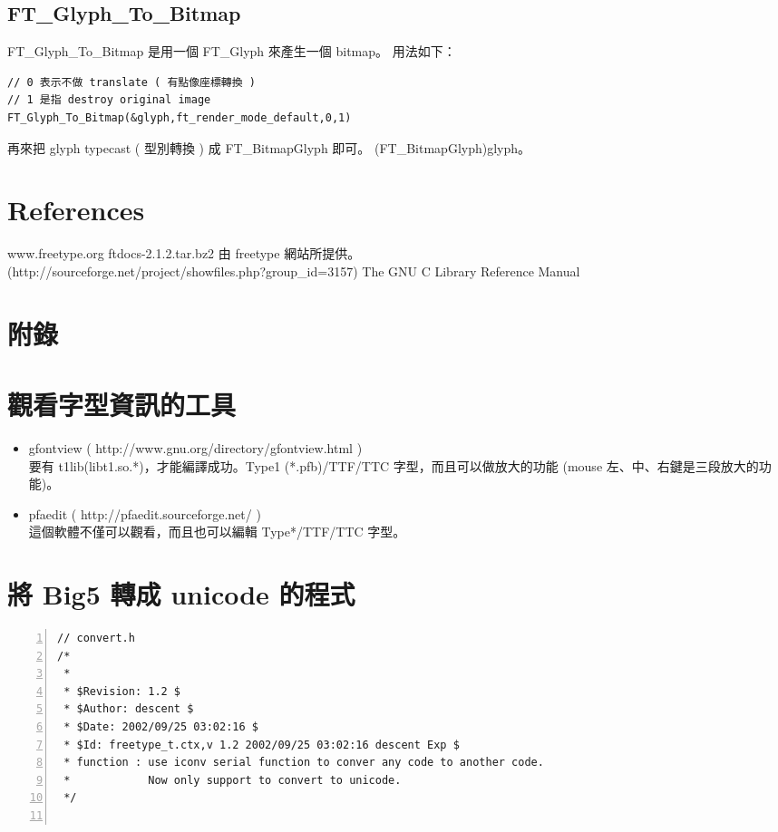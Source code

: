 \documentclass[12pt,a4]{article}
\begin{document}
\begin{CJK}{UTF8}{bsmi}
\subsection{FT\_{}Glyph\_{}To\_{}Bitmap}
FT\_{}Glyph\_{}To\_{}Bitmap 是用一個 FT\_{}Glyph 來產生一個 bitmap。 用法如下：
\begin{Verbatim}[commandchars=+!?]
// 0 表示不做 translate ( 有點像座標轉換 )
// 1 是指 destroy original image
FT_Glyph_To_Bitmap(&glyph,ft_render_mode_default,0,1)
\end{Verbatim}
再來把 glyph typecast ( 型別轉換 ) 成 FT\_{}BitmapGlyph 即可。
(FT\_{}BitmapGlyph)glyph。



\newpage
\section{References}
\begin{thebibliography}{99}
www.freetype.org
ftdocs-2.1.2.tar.bz2 由 freetype 網站所提供。\\
(http://sourceforge.net/project/showfiles.php?group\_{}id=3157)
The GNU C Library Reference Manual
\end{thebibliography}

\newpage
\section{附錄}
\appendix
\section{觀看字型資訊的工具}
\begin{itemize}
\item
gfontview ( http://www.gnu.org/directory/gfontview.html )\\
要有 t1lib(libt1.so.*)，才能編譯成功。Type1 (*.pfb)/TTF/TTC 字型，而且可以做放大的功能 (mouse 左、中、右鍵是三段放大的功能)。
\item
pfaedit ( http://pfaedit.sourceforge.net/ )\\ 
這個軟體不僅可以觀看，而且也可以編輯 Type*/TTF/TTC 字型。 
\newpage
\end{itemize}
\section{\label{big52unicode}將 Big5 轉成 unicode 的程式}
\begin{Verbatim}[commandchars=@\^?,numbers=left]
// convert.h
/*
 *
 * $Revision: 1.2 $
 * $Author: descent $
 * $Date: 2002/09/25 03:02:16 $
 * $Id: freetype_t.ctx,v 1.2 2002/09/25 03:02:16 descent Exp $
 * function : use iconv serial function to conver any code to another code.
 *            Now only support to convert to unicode. 
 */


\end{Verbatim}
\end{CJK}
\end{document}
